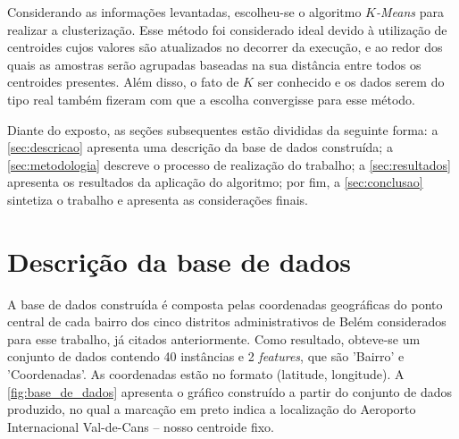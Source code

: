 \documentclass[12pt]{article}
\begin{document}
Considerando as informações levantadas, escolheu-se o algoritmo \textit{$K$-Means} para realizar a clusterização. Esse método foi considerado ideal devido à utilização de centroides cujos valores são atualizados no decorrer da execução, e ao redor dos quais as amostras serão agrupadas baseadas na sua distância entre todos os centroides presentes. Além disso, o fato de $K$ ser conhecido e os dados serem do tipo real também fizeram com que a escolha convergisse para esse método.

Diante do exposto, as seções subsequentes estão divididas da seguinte forma: a \autoref{sec:descricao} apresenta uma descrição da base de dados construída; a \autoref{sec:metodologia} descreve o processo de realização do trabalho; a \autoref{sec:resultados} apresenta os resultados da aplicação do algoritmo; por fim, a \autoref{sec:conclusao} sintetiza o trabalho e apresenta as considerações finais.



\section{Descrição da base de dados} %
\label{sec:descricao}                %



A base de dados construída é composta pelas coordenadas geográficas do ponto central de cada bairro dos cinco distritos administrativos de Belém considerados para esse trabalho, já citados anteriormente. Como resultado, obteve-se um conjunto de dados contendo 40 instâncias e 2 \textit{features}, que são 'Bairro' e 'Coordenadas'. As coordenadas estão no formato (latitude, longitude). A \autoref{fig:base_de_dados} apresenta o gráfico construído a partir do conjunto de dados produzido, no qual a marcação em preto indica a localização do Aeroporto Internacional Val-de-Cans -- nosso centroide fixo.
\end{document}
